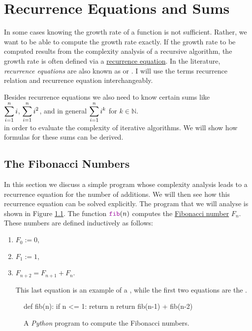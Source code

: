 \chapter{Recurrence Equations and Sums}
In some cases knowing the growth rate of a function is not sufficient.  Rather, we want to be able to compute
the growth rate exactly.  If the growth rate to be computed results from the complexity analysis of a recursive
algorithm, the growth rate is often defined via a
\href{https://en.wikipedia.org/wiki/Recurrence_relation}{recurrence equation}.  In the literature,
\emph{recurrence equations} are also known as  or
.  I will use the terms recurrence relation and
recurrence equation interchangeably.

Besides recurrence equations we also need to know certain sums like 
\\[0.2cm]
\hspace*{1.3cm}
$\displaystyle\sum\limits_{i=1}^n i$,  \quad $\displaystyle\sum\limits_{i=1}^n i^2$, \quad and in general \quad
$\displaystyle \sum\limits_{i=1}^n i^k$ \quad for $k \in \mathbb{N}$.
\\[0.2cm]
in order to evaluate the complexity of iterative algorithms.  We will show how formulas for these sums can be
derived. 

\section{The Fibonacci Numbers}
In this section we discuss a simple program whose complexity analysis
leads to a recurrence equation for the  
number of additions.  We will then see how this recurrence equation can be solved explicitly.  The program that
we will analyse is shown in Figure \ref{fig:Fibonacci.ipynb}.  The function $\mytt{fib}(n)$ computes the
\href{https://en.wikipedia.org/wiki/Fibonacci_number}{Fibonacci number}  $F_n$.  These
numbers are defined inductively as follows:
\begin{enumerate}
\item $F_0 := 0$,
\item $F_1 := 1$, 
\item $F_{n+2} = F_{n+1} + F_n$.

  This last equation is an example of a , while the first two equations are the
  . 
\end{enumerate}

\begin{figure}[!h]
  \centering
\begin{python3code} 
    def fib(n):
        if n <= 1:
            return n
        return fib(n-1) + fib(n-2)
\end{python3code}
\vspace*{-0.7cm}
  \caption{A \textsl{Python} program to compute the Fibonacci numbers.}
  \label{fig:Fibonacci.ipynb}
\end{figure} 

